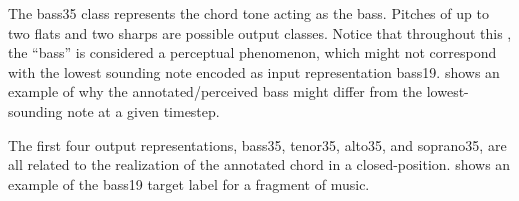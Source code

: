 
The \gls{bass35} class represents the chord tone acting as
the bass. Pitches of up to two flats and two sharps are
possible output classes. Notice that throughout this
\thesisdiss{}, the ``bass'' is considered a perceptual
phenomenon, which might not correspond with the lowest
sounding note encoded as input representation \gls{bass19}.
 shows an example of why
the annotated/perceived bass might differ from the
lowest-sounding note at a given timestep.


The first four output representations, \gls{bass35},
\gls{tenor35}, \gls{alto35}, and \gls{soprano35}, are all
related to the realization of the annotated chord in a
\gls{closed-position}.  shows
an example of the \gls{bass19} target label for a fragment
of music.

